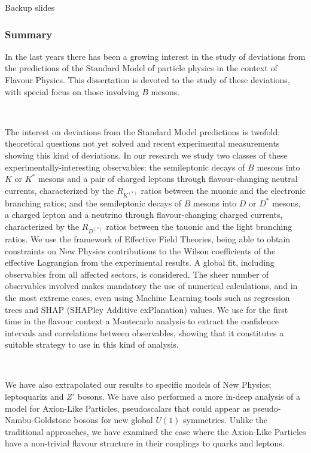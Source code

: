 \documentclass[mathserif, 10pt, dvipsnames]{beamer}
\begin{document}
\begin{frame}
    \begin{block}{\huge Backup slides}

    \end{block}
\end{frame}


\begin{frame}\frametitle{Summary}
    \scriptsize
    In the last years there has been a growing interest in the study of
    deviations from the predictions of the Standard Model of particle
    physics in the context of Flavour Physics. This dissertation is devoted
    to the study of these deviations, with special focus on those involving
    $B$ mesons.

    ~

    The interest on deviations from the Standard Model predictions is
    twofold: theoretical questions not yet solved and recent experimental
    measurements showing this kind of deviations. In our research we study
    two classes of these experimentally-interesting observables: the
    semileptonic decays of $B$ mesons into $K$ or $K^*$ mesons and a pair of
    charged leptons through flavour-changing neutral currents, characterized
    by the $R_{K^{(*)}}$ ratios between the muonic and the electronic branching
    ratios; and the semileptonic decays of $B$ mesons into $D$ or $D^*$ mesons, a
    charged lepton and a neutrino through flavour-changing charged currents,
    characterized by the $R_{D^{(*)}}$ ratios between the tauonic and the light
    branching ratios. We use the framework of Effective Field Theories,
    being able to obtain constraints on New Physics contributions to the
    Wilson coefficients of the effective Lagrangian from the experimental
    results. A global fit, including observables from all affected sectors,
    is considered. The sheer number of observables involved makes mandatory
    the use of numerical calculations, and in the most extreme cases, even
    using Machine Learning tools such as regression trees and SHAP (SHAPley
    Additive exPlanation) values. We use for the first time in the flavour
    context a Montecarlo analysis to extract the confidence intervals and
    correlations between observables, showing that it constitutes a suitable
    strategy to use in this kind of analysis.

    ~

    We have also extrapolated our results to specific models of New Physics;
    leptoquarks and $Z'$ bosons. We have also performed a more in-deep
    analysis of a model for Axion-Like Particles, pseudoscalars that could
    appear as pseudo-Nambu-Goldstone bosons for new global $U(1)$ symmetries.
    Unlike the traditional approaches, we have examined the case where the
    Axion-Like Particles have a non-trivial flavour structure in their
    couplings to quarks and leptons.
\end{frame}
\end{document}
